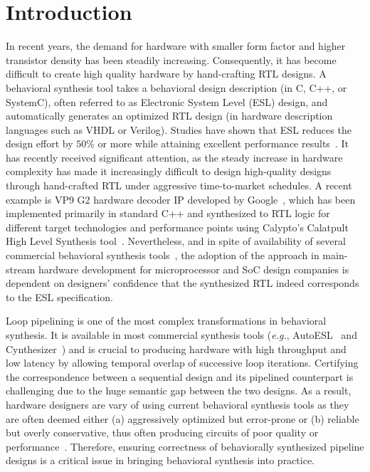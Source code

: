 \section{Introduction}
\label{sec:intro}

In recent years, the demand for hardware with smaller form factor and higher transistor density has been steadily increasing. Consequently, it has become difficult to create high quality hardware by hand-crafting RTL designs. A behavioral synthesis tool takes a behavioral
design description (in C, C++, or SystemC), often referred to as Electronic System Level (ESL) design, and automatically generates an optimized RTL design (in hardware description languages such as VHDL or Verilog). 
Studies have shown that ESL 
reduces the design effort by $50\%$ or more while attaining
excellent performance results~\cite{Moussa99}. 
It has recently received significant attention, as the steady 
increase in hardware complexity has made it increasingly 
difficult to design high-quality designs through hand-crafted RTL under 
aggressive time-to-market schedules.  A recent example is VP9 G2 hardware
decoder IP developed by Google~\cite{googledecoder}, which has been implemented primarily in 
standard C++ and synthesized to RTL logic for different target technologies 
and performance points using Calypto's Calatpult High Level Synthesis 
tool~\cite{catapult}. Nevertheless, and in spite of availability of several
commercial behavioral synthesis tools~\cite{ctos,forte,vivado},
the adoption of the approach in main-stream hardware development for
microprocessor and SoC design companies is dependent on 
designers' confidence that the synthesized RTL indeed corresponds to the ESL
specification. 

Loop pipelining is one of the most complex transformations in behavioral synthesis. It is available in most commercial synthesis tools ({\em e.g.}, AutoESL~\cite{autoesl} and Cynthesizer~\cite{forte}) and is
crucial to producing hardware with high throughput and low latency by allowing temporal overlap of successive loop
iterations. Certifying the correspondence between a sequential design and its pipelined counterpart is challenging due to the huge semantic gap between the two
designs. As a result, hardware designers are vary of using current behavioral synthesis tools as
they are often deemed either (a) aggressively optimized but error-prone or (b) 
reliable but overly conservative, thus often producing circuits of poor quality
or performance~\cite{spark,kundu2008}. Therefore, ensuring
correctness of behaviorally synthesized pipeline designs
is a critical issue in bringing behavioral synthesis into practice.


